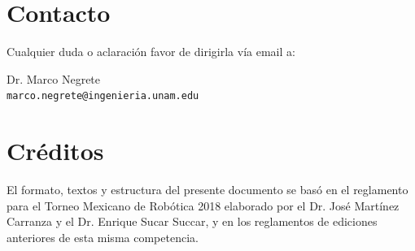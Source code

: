 \documentclass[letterpaper,12pt]{article}
\begin{document}
\section{Contacto}
Cualquier duda o aclaración favor de dirigirla vía email a:

Dr. Marco Negrete\\ \texttt{marco.negrete@ingenieria.unam.edu}


\section*{Créditos}
El formato, textos y estructura del presente documento se basó en el reglamento para el Torneo Mexicano de Robótica 2018 elaborado por el Dr. José Martínez Carranza y el Dr. Enrique Sucar Succar, y en los reglamentos de ediciones anteriores de esta misma competencia. 
\end{document}
